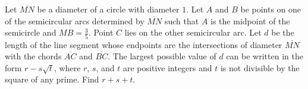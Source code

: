 Let $ \overline{MN}$ be a diameter of a circle with diameter $ 1$. Let $ A$ and $ B$ be points on one of the semicircular arcs determined by $ \overline{MN}$ such that $ A$ is the midpoint of the semicircle and $ MB=\frac35$. Point $ C$ lies on the other semicircular arc. Let $ d$ be the length of the line segment whose endpoints are the intersections of diameter $ \overline{MN}$ with the chords $ \overline{AC}$ and $ \overline{BC}$. The largest possible value of $ d$ can be written in the form $ r-s\sqrt{t}$, where $ r$, $ s$, and $ t$ are positive integers and $ t$ is not divisible by the square of any prime. Find $ r+s+t$.